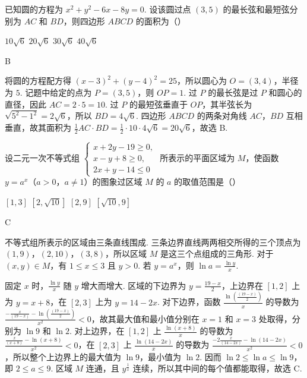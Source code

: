 \begin{problem}
已知圆的方程为 \(x^{2} + y^{2} - 6x - 8y = 0\). 设该圆过点 \((3,5)\) 的最长弦和最短弦分别为 \(AC\) 和 \(BD\)，则四边形 \(ABCD\) 的面积为（\quad）

\choices
    {\(10\sqrt{6}\)}
    {\(20\sqrt{6}\)}
    {\(30\sqrt{6}\)}
    {\(40\sqrt{6}\)}
\end{problem}

\begin{answer}
B
\end{answer}

\begin{solution}
将圆的方程配方得 \((x-3)^2+(y-4)^2=25\)，所以圆心为 \(O=(3,4)\)，半径为 \(5\). 记题中给定的点为 \(P=(3,5)\)，则 \(OP=1\). 过 \(P\) 的最长弦是过 \(P\) 和圆心的直径，因此 \(AC=2\cdot5=10\). 过 \(P\) 的最短弦垂直于 \(OP\)，其半弦长为 \(\sqrt{5^2-1^2}=2\sqrt6\)，所以 \(BD=4\sqrt6\). 四边形 \(ABCD\) 的两条对角线 \(AC\)，\(BD\) 互相垂直，故其面积为 \(\frac12 AC\cdot BD=\frac12\cdot10\cdot4\sqrt6=20\sqrt6\)，故选 B.
\end{solution}

\begin{problem}
设二元一次不等式组 \(\begin{cases}
x + 2y - 19 \geqslant 0,\\
x - y + 8 \geqslant 0,\\
2x + y - 14 \leqslant 0
\end{cases}\) 所表示的平面区域为 \(M\)，使函数 \(y = a^x\)（\(a > 0\)，\(a \neq 1\)）的图象过区域 \(M\) 的 \(a\) 的取值范围是（\quad）

\choices
    {\([1,3]\)}
    {\([2,\sqrt{10}]\)}
    {\([2,9]\)}
    {\([\sqrt{10},9]\)}
\end{problem}

\begin{answer}
C
\end{answer}

\begin{solution}
不等式组所表示的区域由三条直线围成. 三条边界直线两两相交所得的三个顶点为
\((1,9)\)，\((2,10)\)，\((3,8)\)，所以区域 \(M\) 是这三个点组成的三角形. 对于 \((x,y)\in M\)，有 \(1\leqslant x\leqslant3\) 且 \(y>0\). 若 \(y=a^x\)，则
\(\ln a=\frac{\ln y}{x}\).

固定 \(x\) 时，\(\frac{\ln y}{x}\) 随 \(y\) 增大而增大. 区域的下边界为 \(y=\frac{19-x}{2}\)，上边界在 \([1,2]\) 上为 \(y=x+8\)，在 \([2,3]\) 上为 \(y=14-2x\). 对下边界，函数
\(\frac{\ln(\frac{(19-x)}{2})}{x}\) 的导数为
\(\frac{-\frac{x}{(19-x)}-\ln(\frac{(19-x)}{2})}{x^2}<0\)，故其最大值和最小值分别在 \(x=1\) 和 \(x=3\) 处取得，分别为 \(\ln9\) 和 \(\ln2\). 对上边界，在 \([1,2]\) 上
\(\frac{\ln(x+8)}{x}\) 的导数为 \(\frac{\frac{x}{(x+8)}-\ln(x+8)}{x^2}<0\)，在 \([2,3]\) 上
\(\frac{\ln(14-2x)}{x}\) 的导数为 \(\frac{-2\frac{x}{(14-2x)}-\ln(14-2x)}{x^2}<0\)，所以整个上边界上的最大值为 \(\ln9\)，最小值为 \(\ln2\). 因而
\(\ln2\leqslant\ln a\leqslant\ln9\)，即 \(2\leqslant a\leqslant9\). 区域 \(M\) 连通，且 \(y^{\frac{1}{x}}\) 连续，所以其中间的每个值都能取得，故选 C.
\end{solution}

